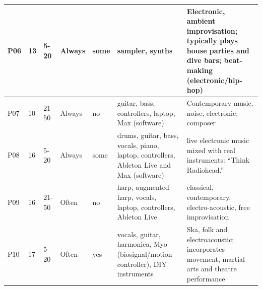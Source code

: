 \documentclass[letterpaper, 12pt]{article}
\begin{document}
\begin{spacing}{1.1}
\begin{longtable}{ C{0.6cm} C{1.1cm} C{1.3cm} C{1.3cm} C{1.3cm} L{3.2cm} L{4.6cm} }
        P06 &
        13 &
        5-20 &
        Always &
        some &
        sampler, synths &
        Electronic, ambient improvisation; typically plays house parties and dive bars; beat-making (electronic/hip-hop) \\ \hline
        
        P07 &
        10 &
        21-50 &
        Always &
        no &
        guitar, bass, controllers, laptop, Max (software) &
        Contemporary music, noise, electronic; composer \\ \hline
        
        P08 &
        16 &
        5-20 &
        Always &
        some &
        drums, guitar, bass, vocals, piano, laptop, controllers, Ableton Live and Max (software) &
        live electronic music mixed with real instruments: ``Think Radiohead.'' \\ \hline
        
        P09 &
        16 &
        21-50 &
        Often &
        no &
        harp, augmented harp, vocals, laptop, controllers, Ableton Live &
        classical, contemporary, electro-acoustic, free improvisation \\ \hline
        
        P10 &
        17 &
        5-20 &
        Often &
        yes &
        vocals, guitar, harmonica, Myo (biosignal/motion controller), DIY instruments &
        Ska, folk and electroacoustic; incorporates movement, martial arts and theatre performance \\ \hline
    \end{longtable}
\end{spacing}
\end{document}
